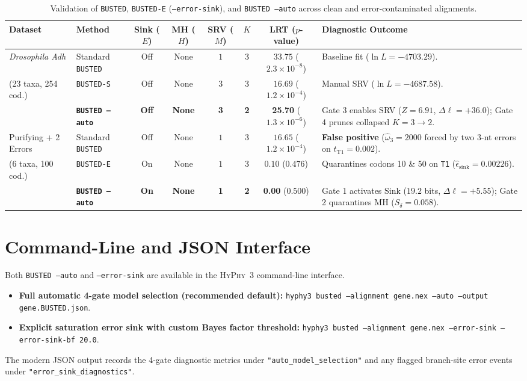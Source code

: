\documentclass[11pt]{article}
\begin{document}
\begin{table}[htbp]
\centering
\footnotesize
\setlength{\tabcolsep}{4pt}
\caption{Validation of \texttt{BUSTED}, \texttt{BUSTED-E} (\texttt{--error-sink}), and \texttt{BUSTED --auto} across clean and error-contaminated alignments.}
\label{tab:validation}
\begin{tabularx}{\textwidth}{llcccccY}
\toprule
Dataset & Method & Sink ($E$) & MH ($H$) & SRV ($M$) & $K$ & LRT ($p$-value) & Diagnostic Outcome \\
\midrule
\textit{Drosophila Adh} & Standard \texttt{BUSTED} & Off & None & $1$ & $3$ & $33.75$ ($2.3 \times 10^{-8}$) & Baseline fit ($\ln L = -4703.29$). \\
(23 taxa, 254 cod.) & \texttt{BUSTED-S} & Off & None & $3$ & $3$ & $16.69$ ($1.2 \times 10^{-4}$) & Manual SRV ($\ln L = -4687.58$). \\
 & \textbf{\texttt{BUSTED --auto}} & \textbf{Off} & \textbf{None} & \textbf{3} & \textbf{2} & \textbf{25.70} ($1.3 \times 10^{-6}$) & Gate 3 enables SRV ($Z=6.91$, $\Delta\ell=+36.0$); Gate 4 prunes collapsed $K=3 \to 2$. \\
\midrule
Purifying + 2 Errors & Standard \texttt{BUSTED} & Off & None & $1$ & $3$ & $16.65$ ($1.2 \times 10^{-4}$) & \textbf{False positive} ($\hat{\omega}_3 = 2000$ forced by two 3-nt errors on $t_{\text{T1}} = 0.002$). \\
(6 taxa, 100 cod.) & \texttt{BUSTED-E} & On & None & $1$ & $3$ & $0.10$ ($0.476$) & Quarantines codons 10 \& 50 on \texttt{T1} ($\hat{\epsilon}_{\text{sink}} = 0.00226$). \\
 & \textbf{\texttt{BUSTED --auto}} & \textbf{On} & \textbf{None} & \textbf{1} & \textbf{2} & \textbf{0.00} ($0.500$) & Gate 1 activates Sink ($19.2$ bits, $\Delta\ell=+5.55$); Gate 2 quarantines MH ($S_\delta=0.058$). \\
\bottomrule
\end{tabularx}
\end{table}

\section{Command-Line and JSON Interface}

Both \texttt{BUSTED --auto} and \texttt{--error-sink} are available in the \textsc{HyPhy}~3 command-line interface.
\begin{itemize}[nosep]
    \item \textbf{Full automatic 4-gate model selection (recommended default):} \texttt{hyphy3 busted --alignment gene.nex --auto --output gene.BUSTED.json}.
    \item \textbf{Explicit saturation error sink with custom Bayes factor threshold:} \texttt{hyphy3 busted --alignment gene.nex --error-sink --error-sink-bf 20.0}.
\end{itemize}
The modern JSON output records the 4-gate diagnostic metrics under \texttt{"auto\_model\_selection"} and any flagged branch-site error events under \texttt{"error\_sink\_diagnostics"}.
\end{document}
